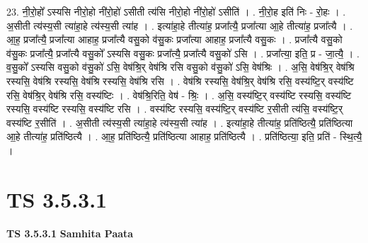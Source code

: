 \documentclass[17pt]{extarticle}
\begin{document}
23. नी॒रो॒हो᳚ ऽस्यसि नीरो॒हो नी॑रो॒हो॑ ऽसीती त्य॑सि नीरो॒हो नी॑रो॒हो॑ ऽसीति॑ । . नी॒रो॒ह इति॑ निः - रो॒हः । . अ॒सीती त्य॑स्य॒सी त्या॑हा॒हे त्य॑स्य॒सी त्या॑ह । . इत्या॑हा॒हे तीत्या॑ह॒ प्रजा᳚त्यै॒ प्रजा᳚त्या आ॒हे तीत्या॑ह॒ प्रजा᳚त्यै । . आ॒ह॒ प्रजा᳚त्यै॒ प्रजा᳚त्या आहाह॒ प्रजा᳚त्यै वसु॒को व॑सु॒कः प्रजा᳚त्या आहाह॒ प्रजा᳚त्यै वसु॒कः । . प्रजा᳚त्यै वसु॒को व॑सु॒कः प्रजा᳚त्यै॒ प्रजा᳚त्यै वसु॒को᳚ ऽस्यसि वसु॒कः प्रजा᳚त्यै॒ प्रजा᳚त्यै वसु॒को॑ ऽसि । . प्रजा᳚त्या॒ इति॒ प्र - जा॒त्यै॒ । . व॒सु॒को᳚ ऽस्यसि वसु॒को व॑सु॒को॑ ऽसि॒ वेष॑श्रि॒र् वेष॑श्रि रसि वसु॒को व॑सु॒को॑ ऽसि॒ वेष॑श्रिः । . अ॒सि॒ वेष॑श्रि॒र् वेष॑श्रि रस्यसि॒ वेष॑श्रि रस्यसि॒ वेष॑श्रि रस्यसि॒ वेष॑श्रि रसि । . वेष॑श्रि रस्यसि॒ वेष॑श्रि॒र् वेष॑श्रि रसि॒ वस्य॑ष्टि॒र् वस्य॑ष्टि रसि॒ वेष॑श्रि॒र् वेष॑श्रि रसि॒ वस्य॑ष्टिः । . वेष॑श्रि॒रिति॒ वेष॑ - श्रिः॒ । . अ॒सि॒ वस्य॑ष्टि॒र् वस्य॑ष्टि रस्यसि॒ वस्य॑ष्टि रस्यसि॒ वस्य॑ष्टि रस्यसि॒ वस्य॑ष्टि रसि । . वस्य॑ष्टि रस्यसि॒ वस्य॑ष्टि॒र् वस्य॑ष्टि र॒सीती त्य॑सि॒ वस्य॑ष्टि॒र् वस्य॑ष्टि र॒सीति॑ । . अ॒सीती त्य॑स्य॒सी त्या॑हा॒हे त्य॑स्य॒सी त्या॑ह । . इत्या॑हा॒हे तीत्या॑ह॒ प्रति॑ष्ठित्यै॒ प्रति॑ष्ठित्या आ॒हे तीत्या॑ह॒ प्रति॑ष्ठित्यै । . आ॒ह॒ प्रति॑ष्ठित्यै॒ प्रति॑ष्ठित्या आहाह॒ प्रति॑ष्ठित्यै । . प्रति॑ष्ठित्या॒ इति॒ प्रति॑ - स्थि॒त्यै॒ । \newline
\pagebreak
{}

\section{ TS 3.5.3.1 }

\textbf{TS 3.5.3.1 } \newline
\textbf{Samhita Paata} \newline
\end{document}

